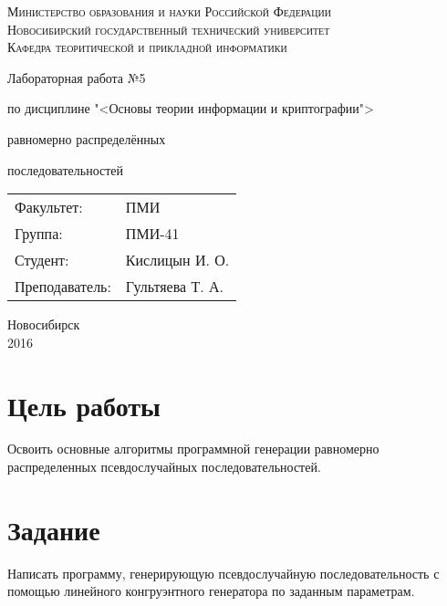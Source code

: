\documentclass[oneside, final, 12pt]{extarticle}
\begin{document}
\begin{titlepage}
	\begin{centering}
		\textsc{Министерство образования и науки Российской Федерации}\\
		\textsc{Новосибирский государственный технический университет}\\
		\textsc{Кафедра теоритической и прикладной информатики}\\
	\end{centering}
	\vfill
	\vfill
	\vfill
	\Large
	\centerline{Лабораторная работа №5}
	\centerline{по дисциплине "<Основы теории информации и криптографии">}
	\centerline{ равномерно распределённых}
	\centerline{ последовательностей}
	\normalsize
	\vfill
	\vfill
	\vfill
	\begin{flushleft}
		\begin{minipage}{0.3\textwidth}
			\begin{tabular}{l l}
				Факультет: & ПМИ\\
				Группа: & ПМИ-41\\
				Студент: & Кислицын И. О.\\
				Преподаватель: & Гультяева Т. А. 
			\end{tabular}
		\end{minipage}
	\end{flushleft}
	\vfill
	\vfill
	\begin{centering}
		Новосибирск\\
		2016\\
	\end{centering}
\end{titlepage}
\setcounter{page}{2}
\lstset{
	breaklines=\true,
	basicstyle=\footnotesize\ttfamily,
	tabsize=2,
	showspaces=\false,
	breaklines=\true,
	breakatwhitespace=\true,
	extendedchars=\true,
	keepspaces=\true,
	language=Haskell
}
\section{Цель работы}
Освоить основные алгоритмы программной генерации равномерно распределенных псевдослучайных последовательностей.

\section{Задание}
Написать программу, генерирующую псевдослучайную последовательность с помощью линейного конгруэнтного генератора по заданным параметрам.
\end{document}
